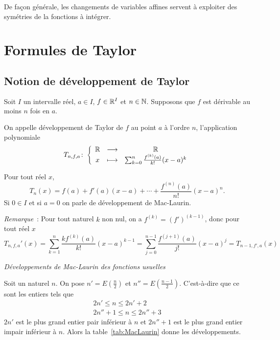 De façon générale, les changements de variables affines servent à exploiter des 
symétries de la fonctions à intégrer.

\section{Formules de Taylor}

\subsection{Notion de développement de Taylor}

\begin{defdef}
  Soit \(I\) un intervalle réel, \(a \in I\), \(f \in \mathbb{R}^I\) et \(n \in \mathbb{N}\). 
  Supposons que \(f\) est dérivable au moins \(n\) fois en \(a\).

  On appelle développement de Taylor de \(f\) au point \(a\) à l'ordre \(n\), 
  l'application polynomiale
  \begin{equation}
    T_{n,f,a}\colon\left\{\begin{array}{ccc}\mathbb{R} & \longrightarrow &\mathbb{R}\\x & \longmapsto & \sum_{k = 0}^n \frac{f^{(k)}(a)}{k!}(x-a)^k\end{array}\right.
  \end{equation}

  Pour tout réel \(x\),
  \begin{equation}
    T_{n}(x)= f(a) + f'(a)(x-a) + \dotsb +\frac{f^{(n)}(a)}{n!}(x-a)^n.
  \end{equation}
Si \(0 \in I\) et si \(a = 0\) on parle de développement de Mac-Laurin. 
\end{defdef}

\emph{Remarque}~: Pour tout naturel \(k\) non nul, on a \(f^{(k)} = 
(f')^{(k-1)}\), donc pour tout réel \(x\)
\begin{equation}
  T_{n,f,a}'(x) = \sum_{k = 1}^n \frac{k f^{(k)}(a)}{k!}(x-a)^{k-1} = 
  \sum_{j = 0}^{n-1} \frac{f^{(j+1)}(a)}{j!}(x-a)^j = T_{n-1,f',a}(x)
\end{equation}

\emph{Développements de Mac-Laurin des fonctions usuelles}

Soit un naturel \(n\). On pose \(n' = E\left(\frac{n}{2}\right)\) et 
\(n'' = E\left(\frac{n-1}{2}\right)\). C'est-à-dire que ce sont les entiers tels 
que
\begin{align*}
  2n' \leqslant n \leqslant 2n'+2 \\
  2n'' +1 \leqslant n \leqslant 2n''+3
\end{align*}
\(2n'\) est le plus grand entier pair inférieur à \(n\) et \(2n''+1\) est le 
plus grand entier impair inférieur à \(n\). Alors la table~\ref{tab:MacLaurin} donne les développements.

